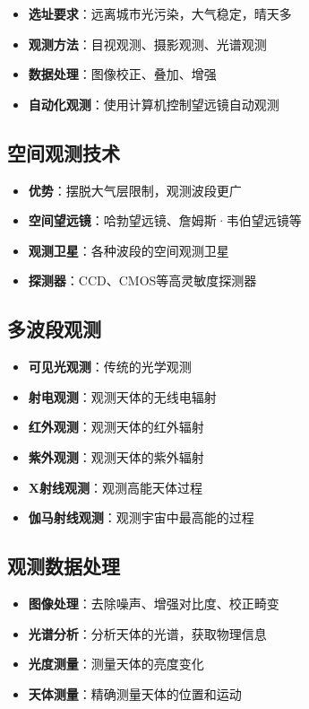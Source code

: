 \documentclass[12pt,UTF8]{ctexbook}
\begin{document}
\begin{itemize}
  \item \textbf{选址要求}：远离城市光污染，大气稳定，晴天多
  \item \textbf{观测方法}：目视观测、摄影观测、光谱观测
  \item \textbf{数据处理}：图像校正、叠加、增强
  \item \textbf{自动化观测}：使用计算机控制望远镜自动观测
\end{itemize}

\subsection{空间观测技术}

\begin{itemize}
  \item \textbf{优势}：摆脱大气层限制，观测波段更广
  \item \textbf{空间望远镜}：哈勃望远镜、詹姆斯·韦伯望远镜等
  \item \textbf{观测卫星}：各种波段的空间观测卫星
  \item \textbf{探测器}：CCD、CMOS等高灵敏度探测器
\end{itemize}

\subsection{多波段观测}

\begin{itemize}
  \item \textbf{可见光观测}：传统的光学观测
  \item \textbf{射电观测}：观测天体的无线电辐射
  \item \textbf{红外观测}：观测天体的红外辐射
  \item \textbf{紫外观测}：观测天体的紫外辐射
  \item \textbf{X射线观测}：观测高能天体过程
  \item \textbf{伽马射线观测}：观测宇宙中最高能的过程
\end{itemize}

\subsection{观测数据处理}

\begin{itemize}
  \item \textbf{图像处理}：去除噪声、增强对比度、校正畸变
  \item \textbf{光谱分析}：分析天体的光谱，获取物理信息
  \item \textbf{光度测量}：测量天体的亮度变化
  \item \textbf{天体测量}：精确测量天体的位置和运动
\end{itemize}
\end{document}
